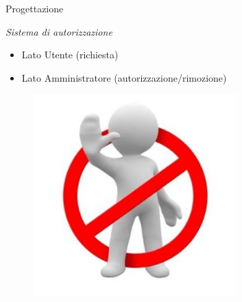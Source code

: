 \begin{frame}{Progettazione}
\begin{minipage}{0.3\textwidth}
\begin{figure}
				\end{figure}
			\end{minipage}
			\begin{minipage}{0.6\textwidth}
				\emph{Sistema di autorizzazione}
				\begin{itemize}
					\item Lato Utente (richiesta)
					\item Lato Amministratore (autorizzazione/rimozione)
				\end{itemize}
			\end{minipage}
			\begin{minipage}{0.3\textwidth}
				\begin{figure}
					\includegraphics[width=0.7\textwidth]{capitolo_3/immagini/autorize.jpg}
				\end{figure}
			\end{minipage}
		\end{frame}
